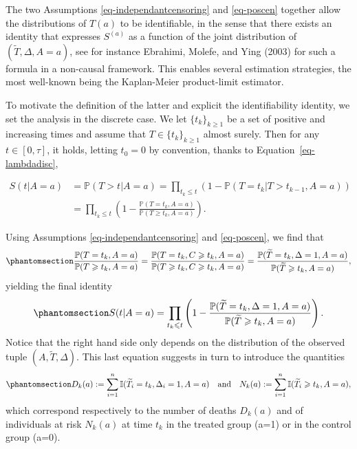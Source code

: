 \documentclass[
  11pt,
  a4paper,
]{article}
\theoremstyle{plain}
\theoremstyle{plain}
\theoremstyle{plain}
\theoremstyle{definition}
\theoremstyle{remark}
\begin{document}
The two Assumptions \ref{eq-independantcensoring} and \ref{eq-poscen}
together allow the distributions of \(T(a)\) to be identifiable, in the
sense that there exists an identity that expresses \(S^{(a)}\) as a
function of the joint distribution of \((\widetilde T,\Delta,A=a)\), see
for instance Ebrahimi, Molefe, and Ying (2003) for such a formula in a
non-causal framework. This enables several estimation strategies, the
most well-known being the Kaplan-Meier product-limit estimator.

To motivate the definition of the latter and explicit the
identifiability identity, we set the analysis in the discrete case. We
let \(\{t_k\}_{k \geqslant 1}\) be a set of positive and increasing
times and assume that \(T \in \{t_k\}_{k \geqslant 1}\) almost surely.
Then for any \(t \in [0,\tau]\), it holds, letting \(t_0 = 0\) by
convention, thanks to Equation~\ref{eq-lambdadisc},

\begin{align*}
S(t| A=a) &= \mathbb{P}(T > t|A=a) = \prod_{t_k \leqslant t} \left(1 - \mathbb{P}(T = t_k | T > t_{k-1}, A=a)\right) \\
&= \prod_{t_k \leqslant t} \left(1 - \frac{\mathbb{P}(T = t_{k}, A=a)}{\mathbb{P}(T \geqslant t_{k},A=a)}\right).
\end{align*}

Using Assumptions \ref{eq-independantcensoring} and \ref{eq-poscen}, we
find that \begin{equation}\phantomsection\label{eq-kmindep}{
\frac{\mathbb{P}(T = t_{k}, A=a)}{\mathbb{P}(T \geqslant t_{k},A=a)} = \frac{\mathbb{P}(T = t_{k},C \geqslant t_k,A=a)}{\mathbb{P}(T \geqslant t_{k}, C\geqslant t_k,A=a)} =  \frac{\mathbb{P}(\widetilde T = t_{k}, \Delta = 1,A=a)}{\mathbb{P}( \widetilde T \geqslant t_{k},A=a)},
}\end{equation} yielding the final identity
\begin{equation}\phantomsection\label{eq-kmi}{ 
S(t|A=a) = \prod_{t_k \leqslant t} \left(1-\frac{\mathbb{P}(\widetilde T = t_{k}, \Delta = 1,A=a)}{\mathbb{P}( \widetilde T \geqslant t_{k},A=a)}\right).
}\end{equation} Notice that the right hand side only depends on the
distribution of the observed tuple \((A,\widetilde T,\Delta)\). This
last equation suggests in turn to introduce the quantities
\begin{equation}\phantomsection\label{eq-dknk}{
D_k(a) := \sum_{i=1}^n \mathbb{I}(\widetilde T_i = t_k, \Delta_i = 1, A=a) \quad\text{and}\quad N_k(a) := \sum_{i=1}^n \mathbb{I}(\widetilde T_i \geqslant t_k, A=a),
}\end{equation} which correspond respectively to the number of deaths
\(D_k(a)\) and of individuals at risk \(N_k(a)\) at time \(t_k\) in the
treated group (a=1) or in the control group (a=0).
\end{document}
